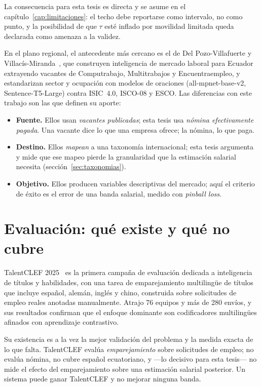 \documentclass[12pt,a4paper,oneside]{report}
\begin{document}
La consecuencia para esta tesis es directa y se asume en el capítulo~\ref{cap:limitaciones}:
el techo debe reportarse como intervalo, no como punto, y la posibilidad de que $\tau$ esté
inflado por movilidad limitada queda declarada como amenaza a la validez.

En el plano regional, el antecedente más cercano es el de Del Pozo-Villafuerte y
Villacís-Miranda~\cite{delpozo2025}, que construyen inteligencia de mercado laboral
para Ecuador extrayendo vacantes de Computrabajo, Multitrabajos y Encuentraempleo, y
estandarizan sector y ocupación con modelos de oraciones (all-mpnet-base-v2,
Sentence-T5-Large) contra ISIC~4.0, ISCO-08 y ESCO. Las diferencias con este trabajo son
las que definen su aporte:

\begin{itemize}
  \item \textbf{Fuente.} Ellos usan \emph{vacantes publicadas}; esta tesis usa
  \emph{nómina efectivamente pagada}. Una vacante dice lo que una empresa ofrece; la
  nómina, lo que paga.
  \item \textbf{Destino.} Ellos \emph{mapean} a una taxonomía internacional; esta tesis
  argumenta y mide que ese mapeo pierde la granularidad que la estimación salarial
  necesita (sección~\ref{sec:taxonomias}).
  \item \textbf{Objetivo.} Ellos producen variables descriptivas del mercado; aquí el
  criterio de éxito es el error de una banda salarial, medido con \emph{pinball loss}.
\end{itemize}

\section{Evaluación: qué existe y qué no cubre}
\label{sec:benchmarks}

TalentCLEF 2025~\cite{gasco2025talentclef} es la primera campaña de evaluación dedicada a
inteligencia de títulos y habilidades, con una tarea de emparejamiento multilingüe de
títulos que incluye español, alemán, inglés y chino, construida sobre solicitudes de
empleo reales anotadas manualmente. Atrajo 76 equipos y más de 280 envíos, y sus
resultados confirman que el enfoque dominante son codificadores multilingües afinados con
aprendizaje contrastivo.

Su existencia es a la vez la mejor validación del problema y la medida exacta de lo que
falta. TalentCLEF evalúa \emph{emparejamiento} sobre solicitudes de empleo; no evalúa
nómina, no cubre español ecuatoriano, y —lo decisivo para esta tesis— no mide el efecto
del emparejamiento sobre una estimación salarial posterior. Un sistema puede ganar
TalentCLEF y no mejorar ninguna banda.
\end{document}
